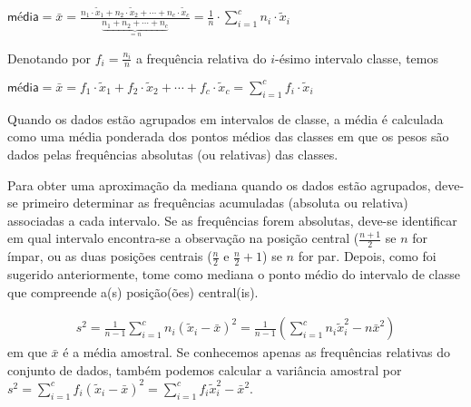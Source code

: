 \(\textsf{média}=\bar{x}=\frac{n_1\cdot \tilde{x}_{1}+n_2\cdot \tilde{x}_{2}+\cdots+n_c\cdot \tilde{x}_{c}}{\underbrace{n_1+n_2+\cdots+n_c}_{=n}}=\frac{1}{n}\cdot \displaystyle{\sum^c_{i=1}}n_i\cdot \tilde{x}_i\)

Denotando por \(f_i=\frac{n_i}{n}\) a frequência relativa do \(i\)-ésimo intervalo classe, temos

\(\textsf{média}=\bar{x}=f_1\cdot \tilde{x}_{1}+f_2\cdot \tilde{x}_{2}+\cdots +f_c\cdot \tilde{x}_{c}=\displaystyle{\sum^c_{i=1}}f_i\cdot \tilde{x}_i\)

Quando os dados estão agrupados em intervalos de classe, a média é calculada como uma média ponderada dos pontos médios das classes em que os pesos são dados pelas frequências absolutas (ou relativas) das classes.


Para obter uma aproximação da mediana quando os dados estão agrupados, deve-se primeiro determinar as frequências acumuladas (absoluta ou relativa) associadas a cada intervalo. Se as frequências forem absolutas, deve-se identificar em qual intervalo encontra-se a observação na posição central (\(\frac{n+1}{2}\) se \(n\) for ímpar, ou as duas posições centrais (\(\frac{n}{2}\) e \(\frac{n}{2}+1\)) se \(n\) for par. Depois, como foi sugerido anteriormente, tome como mediana o ponto médio do intervalo de classe que compreende a(s) posição(ões) central(is).

\begin{equation*}
\begin{split}s^2 = \frac{1}{n-1}\sum^c_{i=1}n_i(\tilde{x}_i-\bar{x})^2=\frac{1}{n-1}\left(\sum^c_{i=1}n_i\tilde{x}^2_i- n\bar{x}^2\right )\end{split}
\end{equation*}
em que \(\bar{x}\) é a média amostral. Se conhecemos apenas as frequências relativas do conjunto de dados, também podemos calcular a variância amostral por \(s^2=\displaystyle{\sum^c_{i=1}}f_i(\tilde{x}_i-\bar{x})^2=\displaystyle{\sum^c_{i=1}}f_i\tilde{x}^2_i -\bar{x}^2\).

